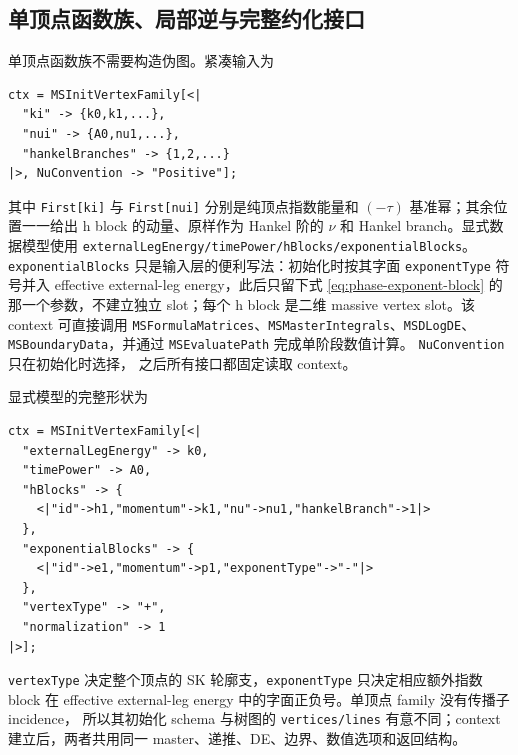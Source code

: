 \documentclass[11pt,a4paper]{ctexart}
\begin{document}
\subsection{单顶点函数族、局部逆与完整约化接口}
\label{sec:reduction-interface}

单顶点函数族不需要构造伪图。紧凑输入为
\begin{verbatim}
ctx = MSInitVertexFamily[<|
  "ki" -> {k0,k1,...},
  "nui" -> {A0,nu1,...},
  "hankelBranches" -> {1,2,...}
|>, NuConvention -> "Positive"];
\end{verbatim}
其中 \texttt{First[ki]} 与 \texttt{First[nui]} 分别是纯顶点指数能量和 $(-\tau)$
基准幂；其余位置一一给出 h block 的动量、原样作为 Hankel 阶的 $\nu$ 和 Hankel branch。显式数据模型使用
\texttt{externalLegEnergy/}\allowbreak\texttt{timePower/}\allowbreak\texttt{hBlocks/}\allowbreak\texttt{exponentialBlocks}。\texttt{exponentialBlocks} 只是输入层的便利写法：初始化时按其字面 \texttt{exponentType} 符号并入 effective external-leg energy，此后只留下式 \eqref{eq:phase-exponent-block} 的那一个参数，不建立独立 slot；每个 h block 是二维 massive vertex slot。该 context 可直接调用
\texttt{MSFormulaMatrices}、\texttt{MSMasterIntegrals}、\texttt{MSDLogDE}、
\texttt{MSBoundaryData}，并通过 \texttt{MSEvaluatePath} 完成单阶段数值计算。
\texttt{NuConvention} 只在初始化时选择，
之后所有接口都固定读取 context。

显式模型的完整形状为
\begin{verbatim}
ctx = MSInitVertexFamily[<|
  "externalLegEnergy" -> k0,
  "timePower" -> A0,
  "hBlocks" -> {
    <|"id"->h1,"momentum"->k1,"nu"->nu1,"hankelBranch"->1|>
  },
  "exponentialBlocks" -> {
    <|"id"->e1,"momentum"->p1,"exponentType"->"-"|>
  },
  "vertexType" -> "+",
  "normalization" -> 1
|>];
\end{verbatim}
\texttt{vertexType} 决定整个顶点的 SK 轮廓支，\texttt{exponentType} 只决定相应额外指数
block 在 effective external-leg energy 中的字面正负号。单顶点 family 没有传播子 incidence，
所以其初始化 schema 与树图的 \texttt{vertices/lines} 有意不同；context 建立后，两者共用同一
master、递推、DE、边界、数值选项和返回结构。
\end{document}
